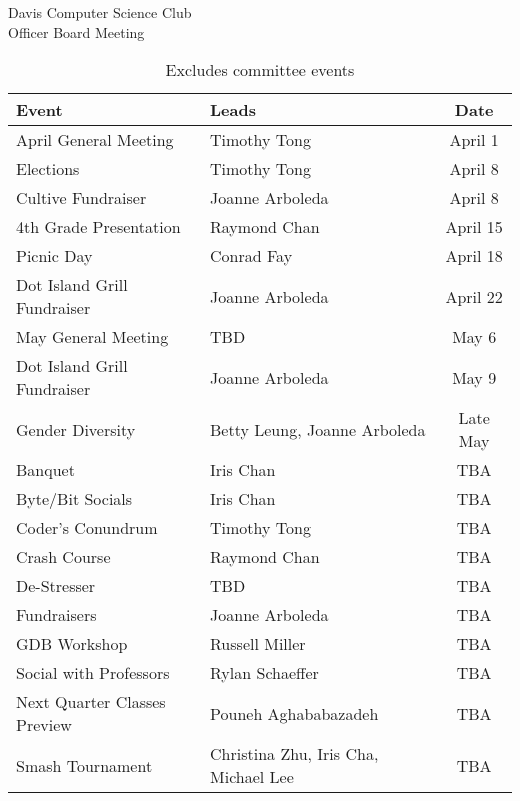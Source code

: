 \documentclass{article}
\begin{document}
\begin{Minutes}{Davis Computer Science Club\\Officer Board Meeting}
\begin{table}[h]
	\centering
	\renewcommand*{\arraystretch}{1.5}
	\begin{tabular}{l l c}
		Event
			&	Leads
			&	Date\\
		\hline
		April General Meeting
			&	Timothy Tong
			&	April 1\\
		Elections
			&	Timothy Tong
			&	April 8\\
		Cultive Fundraiser
			&	Joanne Arboleda
			&	April 8\\
		4th Grade Presentation	
			&	Raymond Chan
			&	April 15\\
		Picnic Day
			&	Conrad Fay
			&	April 18\\
		Dot Island Grill Fundraiser
			&	Joanne Arboleda
			&	April 22\\
		May General Meeting
			&	TBD
			&	May 6\\
		Dot Island Grill Fundraiser
			&	Joanne Arboleda
			&	May 9\\
		Gender Diversity	
			&	Betty Leung, Joanne Arboleda	
			&	Late May\\
		Banquet
			&	Iris Chan
			&	TBA\\
		Byte/Bit Socials
			& 	Iris Chan
			&	TBA\\
		Coder's Conundrum	
			&	Timothy Tong	
			&	TBA\\
		Crash Course
			&	Raymond Chan
			&	TBA\\
		De-Stresser
			&	TBD
			&	TBA\\
		Fundraisers
			&	Joanne Arboleda
			& 	TBA\\
		GDB Workshop		
			&	Russell Miller	
			&	TBA\\
		Social with Professors
			&	Rylan Schaeffer
			&	TBA\\
		Next Quarter Classes Preview
			&	Pouneh Aghababazadeh
			&	TBA\\
		Smash Tournament	
			&	Christina Zhu, Iris Cha, Michael Lee
			&	TBA\\
	\end{tabular}
	\caption*{Excludes committee events}
\end{table}


\end{Minutes}
\end{document}
